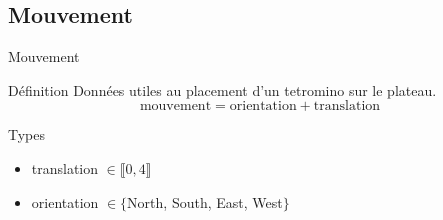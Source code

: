 \documentclass[tikz, footheight=2em]{beamer}
\begin{document}
\subsection{Mouvement}
\begin{frame}[c]{Mouvement}
  \begin{block}{Définition}
    Données utiles au placement d'un tetromino sur le plateau.
    \pause{}
    \[ \text{mouvement} = \text{orientation} + \text{translation} \]
  \end{block}
  \pause{}
  \begin{block}{Types}
    \begin{itemize}
      \item translation \(\in \llbracket 0, 4 \rrbracket\)
      \item orientation \(\in \{\)North, South, East, West\(\}\)
    \end{itemize}
  \end{block}
\end{frame}
\end{document}
